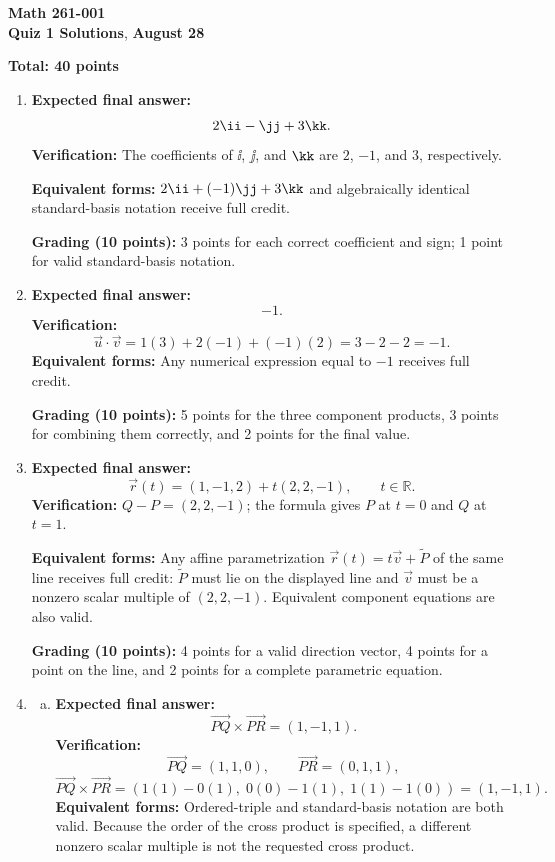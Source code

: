 \documentclass[12pt]{exam}
\newcommand{\class}{Math 261-001}
\newcommand{\examnum}{Quiz 1 Solutions}
\newcommand{\examdate}{August 28}
\begin{document}
\pagestyle{plain}
\thispagestyle{empty}

\noindent
\textbf{\class}\\
\textbf{\examnum}, \textbf{\examdate}

\vspace{10pt}
\textbf{Total: 40 points}

\begin{enumerate}

\item \textbf{Expected final answer:}
\[
  2\ii-\jj+3\kk.
\]
\textbf{Verification:} The coefficients of $\ii$, $\jj$, and $\kk$ are
$2$, $-1$, and $3$, respectively.

\textbf{Equivalent forms:} $2\ii+(-1)\jj+3\kk$ and algebraically identical
standard-basis notation receive full credit.

\textbf{Grading (10 points):} 3 points for each correct coefficient and sign;
1 point for valid standard-basis notation.

\item \textbf{Expected final answer:}
\[
  -1.
\]
\textbf{Verification:}
\[
  \vec{u}\cdot\vec{v}=1(3)+2(-1)+(-1)(2)=3-2-2=-1.
\]
\textbf{Equivalent forms:} Any numerical expression equal to $-1$ receives
full credit.

\textbf{Grading (10 points):} 5 points for the three component products,
3 points for combining them correctly, and 2 points for the final value.

\item \textbf{Expected final answer:}
\[
  \vec{r}(t)=(1,-1,2)
  +t(2,2,-1),\qquad t\in\mathbb{R}.
\]
\textbf{Verification:} $Q-P=(2,2,-1)$; the formula gives $P$
at $t=0$ and $Q$ at $t=1$.

\textbf{Equivalent forms:} Any affine parametrization
$\vec{r}(t)=t\vec{v}+\tilde{P}$ of the same line receives full credit: $\tilde{P}$ must
lie on the displayed line and $\vec{v}$ must be a nonzero scalar multiple
of $(2,2,-1)$. Equivalent component equations are also valid.

\textbf{Grading (10 points):} 4 points for a valid direction vector,
4 points for a point on the line, and 2 points for a complete parametric
equation.

\item
\begin{enumerate}[(a)]
  \item \textbf{Expected final answer:}
  \[
    \overrightarrow{PQ}\times\overrightarrow{PR}=(1,-1,1).
  \]
  \textbf{Verification:}
  \[
    \overrightarrow{PQ}=(1,1,0),\qquad
    \overrightarrow{PR}=(0,1,1),
  \]
  \[
    \overrightarrow{PQ}\times\overrightarrow{PR}
      =(1(1)-0(1),\;0(0)-1(1),\;1(1)-1(0))
      =(1,-1,1).
  \]
  \textbf{Equivalent forms:} Ordered-triple and standard-basis notation are
  both valid. Because the order of the cross product is specified, a different
  nonzero scalar multiple is not the requested cross product.


\end{enumerate}
\end{enumerate}
\end{document}
